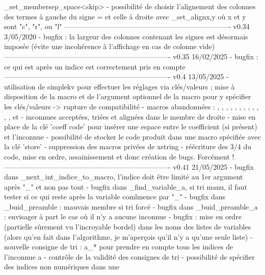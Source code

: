       \SYS_set_membersep_space{<skip>}
    - possibilité de choisir l'alignement des colonnes des termes à
      gauche du signe = et celle à droite avec \SYS_set_align{x,y} où
      x et y sont "c", "r", ou "l"
----------------------------------------------------------------------
v0.34       3/05/2020
    - bugfix : la largeur des colonnes contenant les signes est
      désormais imposée (évite une incohérence à l'affichage en cas
      de colonne vide)
----------------------------------------------------------------------
v0.35       16/02/2025
    - bugfix : ce qui est après un indice est correctement pris en
      compte
----------------------------------------------------------------------
v0.4        13/05/2025
    - utilisation de simplekv pour effectuer les réglages via
      clés/valeurs ; mise à disposition de la macro \setsysteme et de
      l'argument optionnel de la macro \systeme pour y spécifier les
      clés/valeurs -> rupture de compatibilité
    - macros abandonnées : \sysdelim, \syseqsep, \sysalign,
      \syssignspace, \syseqspace, \syslineskipcoeff, \sysequivsign,
      \sysaddeqsign, \sysremoveeqsign, \sysextracolsign,
      \syscodeextracol, \sysautonum, \syssubstitute et 
      \sysnosubstitute
    - inconnues acceptées, triées et alignées dans le membre de droite
    - mise en place de la clé 'coeff code' pour insérer une espace
      entre le coefficient (si présent) et l'inconnue
    - possibilité de stocker le code produit dans une macro spécifiée
      avec la clé 'store'
    - suppression des macros privées de xstring
    - réécriture des 3/4 du code, mise en ordre, assainissement et
      donc création de bugs. Forcément !
----------------------------------------------------------------------
v0.41       21/05/2025
    - bugfix dans \SYS_next_int_indice_to_macro, l'indice doit être
      limité au 1er argument après "_" et non pas tout
    - bugfix dans \SYS_find_variable_a, si tri manu, il faut tester si
      ce qui reste après la variable comlmence par "_"
    - bugfix dans \SYS_buid_preamble : mauvais membre si tri forcé
    - bugfix dans \SYS_buid_preamble_a : envisager à part le cas où
      il n'y a aucune inconnue
    - bugfix : mise en ordre (partielle sûrement vu l'incroyable
      bordel) dans les noms des listes de variables (alors qu'en fait
      dans l'algorithme, je m'aperçois qu'il n'y a qu'une seule liste)
    - nouvelle consigne de tri : a_{*} pour prendre en compte tous les
      indices de l'inconnue a
    - contrôle de la validité des consignes de tri
    - possibilité de spécifier des indices non numériques dans une
